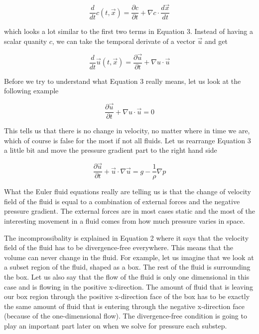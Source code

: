 \begin{equation}
\frac{d}{dt}c(t,\vec{x}) = \frac{\partial c}{\partial t} + \nabla c \cdot \frac{d\vec{x}}{dt}
\end{equation}

which looks a lot similar to the first two terms in Equation 3. Instead of having a scalar quanity $c$, we can take the temporal derivate of a vector $\vec{u}$ and get 

\begin{equation}
\frac{d}{dt}\vec{u}(t,\vec{x}) =  \frac{\partial \vec{u}}{\partial t} + \nabla u \cdot \vec{u}
\end{equation}

Before we try to understand what Equation 3 really means, let us look at the following example

\begin{equation}
\frac{\partial \vec{u}}{\partial t} + \nabla u \cdot \vec{u} = 0
\end{equation}

This tells us that there is no change in velocity, no matter where in time we are, which of course is false for the most if not all fluids. Let us rearrange Equation 3 a little bit and move the pressure gradient part to the right hand side

\begin{equation}
\frac{\partial \vec{u}}{\partial t} + \vec{u} \cdot \nabla \vec{u} = g - \frac{1}{\rho}\nabla p 
\end{equation}

What the Euler fluid equations really are telling us is that the change of velocity field of the fluid is equal to a combination of external forces and the negative pressure gradient. The external forces are in most cases static and the most of the interesting movement in a fluid comes from how much pressure varies in space. 

The incomprossibality is explained in Equation 2 where it says that the velocity field of the fluid has to be divergence-free everywhere. This means that the volume can never change in the fluid. For example, let us imagine that we look at a subset region of the fluid, shaped as a box. The rest of the fluid is surrounding the box. Let us also say that the flow of the fluid is only one dimensional in this case and is flowing in the positive x-direction. The amount of fluid that is leaving our box region through the positive x-direction face of the box has to be exactly the same amount of fluid that is entering through the negative x-direction face (because of the one-dimensional flow). The divergence-free condition is going to play an important part later on when we solve for pressure each substep.
